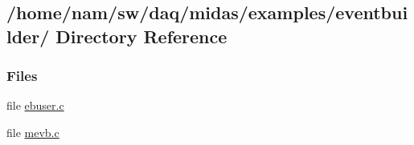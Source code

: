 \subsection{/home/nam/sw/daq/midas/examples/eventbuilder/ Directory Reference}
\label{dir_d46e9f56217c104d716cc271ed25b691}
\subsubsection*{Files}
\begin{DoxyCompactItemize}
\item 
file \hyperlink{ebuser_8c}{ebuser.c}
\item 
file \hyperlink{mevb_8c}{mevb.c}
\end{DoxyCompactItemize}
